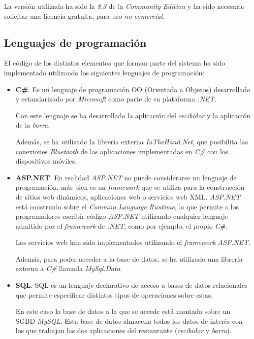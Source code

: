   La versión utilizada ha sido la \emph{8.3} de la \emph{Community Edition} y
  ha sido necesario solicitar una licencia gratuita, para uso \emph{no 
  comercial}.

  \subsection{Lenguajes de programación}
  El código de los distintos elementos que forman parte del sistema ha sido
  implementado utilizando los siguientes lenguajes de programación:

  \begin{itemize} 
  \item \textbf{C\#}.
  Es un lenguaje de programación \acs{OO} (Orientada a Objetos) desarrollado y
  estandarizado por \emph{Microsoft} como parte de su plataforma \emph{.NET}.

  Con este lenguaje se ha desarrollado la aplicación del \emph{recibidor} y
  la aplicación de la \emph{barra}.

  Además, se ha utilizado la librería externa \emph{InTheHand.Net}, que
  posibilita las conexiones \emph{Bluetooth} de las aplicaciones implementadas
  en \emph{C\#} con los dispositivos móviles.

  \item \textbf{ASP.NET}.
  En realidad \emph{ASP.NET} no puede 
  considerarse un lenguaje de programación, más bien es un \emph{framework} 
  que se utiliza para la construcción de sitios web dinámicos, aplicaciones 
  web o servicios web \acs{XML}. \emph{ASP.NET} está construido sobre el
  \emph{Common Language Runtime}, lo que permite a los programadores escribir 
  código \emph{ASP.NET} utilizando cualquier lenguaje admitido por el
  \emph{framework} de \emph{.NET}, como por ejemplo, el propio \emph{C\#}.

  Los servicios web han sido implementados utilizando el \emph{framework}
  \emph{ASP.NET}.

  Además, para poder acceder a la base de datos, se ha utilizado una librería
  externa a \emph{C\#} llamada \emph{MySql.Data}.

  \item \textbf{SQL}.
  \acs{SQL} es un lenguaje declarativo de acceso a bases de
  datos relacionales que permite especificar distintos tipos de operaciones
  sobre estas.

  En este caso la base de datos a la que se accede está montada sobre un
  \acs{SGBD} \emph{MySQL}. Esta base de datos almacena todos los datos de
  interés con los que trabajan las dos aplicaciones del restaurante
  (\emph{recibidor} y \emph{barra}).


\end{itemize}
